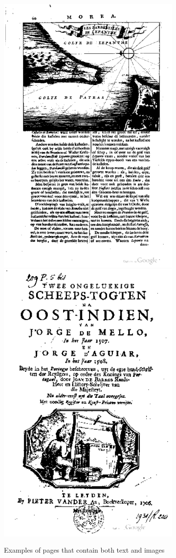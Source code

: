 \begin{figure}[H]
	\centering
	\begin{subfigure}[b]{0.49\textwidth}
		\includegraphics[width=.49\textwidth]{resources/pageImageExample}
		\includegraphics[width=.49\textwidth]{resources/pageImageExample2}
		\caption{Examples of pages that contain both text and images}
		\label{fig:textImageExamples}
	\end{subfigure}
	\begin{subfigure}[b]{0.49\textwidth}

\end{subfigure}
\end{figure}
